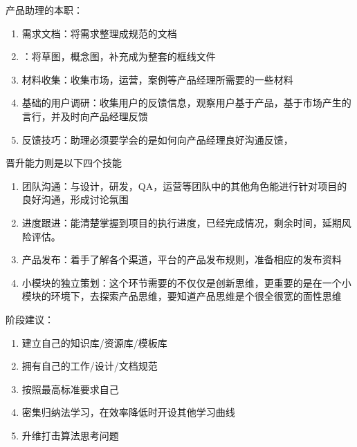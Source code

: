 \documentclass[letterpaper,10pt,english]{sphinxmanual}
\begin{document}
产品助理的本职： %
\begin{footnote}[354]\sphinxAtStartFootnote
{}
%
\end{footnote}
\begin{enumerate}
%
\item {} 
需求文档：将需求整理成规范的文档

\item {} 
：将草图，概念图，补充成为整套的框线文件

\item {} 
材料收集：收集市场，运营，案例等产品经理所需要的一些材料

\item {} 
基础的用户调研：收集用户的反馈信息，观察用户基于产品，基于市场产生的言行，并及时向产品经理反馈

\item {} 
反馈技巧：助理必须要学会的是如何向产品经理良好沟通反馈，

\end{enumerate}

晋升能力则是以下四个技能
\begin{enumerate}
%
\item {} 
团队沟通：与设计，研发，QA，运营等团队中的其他角色能进行针对项目的良好沟通，形成讨论氛围

\item {} 
进度跟进：能清楚掌握到项目的执行进度，已经完成情况，剩余时间，延期风险评估。

\item {} 
产品发布：着手了解各个渠道，平台的产品发布规则，准备相应的发布资料

\item {} 
小模块的独立策划：这个环节需要的不仅仅是创新思维，更重要的是在一个小模块的环境下，去探索产品思维，要知道产品思维是个很全很宽的面性思维

\end{enumerate}

阶段建议：%
\begin{footnote}[355]\sphinxAtStartFootnote
{}
%
\end{footnote}
\begin{enumerate}
%
\item {} 
建立自己的知识库/资源库/模板库

\item {} 
拥有自己的工作/设计/文档规范

\item {} 
按照最高标准要求自己

\item {} 
密集归纳法学习，在效率降低时开设其他学习曲线

\item {} 
升维打击算法思考问题

\end{enumerate}
\end{document}
